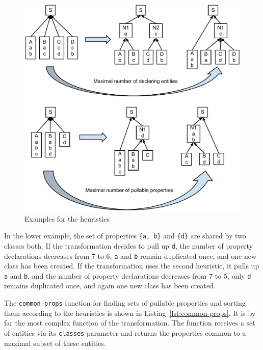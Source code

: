 \documentclass[submission]{eptcs}
\begin{document}
\begin{figure}[t]
  \centering
  \includegraphics[width=0.6\linewidth]{heuristics-example}
  \caption{Examples for the heuristics}
  \label{fig:heuristics-example}
\end{figure}

In the lower example, the set of properties \verb|{a, b}| and \verb|{d}| are
shared by two classes both.  If the transformation decides to pull up \verb|d|,
the number of property declarations decreases from 7 to 6, \verb|a| and
\verb|b| remain duplicated once, and one new class has been created.  If the
transformation uses the second heuristic, it pulls up \verb|a| and \verb|b|,
and the number of property declarations decreases from 7 to 5, only \verb|d|
remains duplicated once, and again one new class has been created.

The \verb|common-props| function for finding sets of pullable properties and
sorting them according to the heuristics is shown in
Listing~\ref{lst:common-props}.  It is by far the most complex function of the
transformation.  The function receives a set of entities via its \verb|classes|
parameter and returns the properties common to a maximal subset of these
entities.
\end{document}
